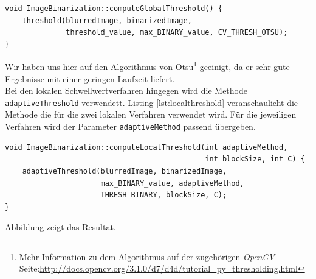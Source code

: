 \begin{lstlisting}[label=lst:globalthreshold, caption=Binarisierung des Eingabebilds mithilfe des globalen Schwellwertverfahrens.]
void ImageBinarization::computeGlobalThreshold() {
	threshold(blurredImage, binarizedImage,
			  threshold_value, max_BINARY_value, CV_THRESH_OTSU);
}
\end{lstlisting}

Wir haben uns hier auf den Algorithmus von Otsu\footnote{Mehr Information zu dem Algorithmus auf der zugehörigen \emph{OpenCV} Seite:\url{http://docs.opencv.org/3.1.0/d7/d4d/tutorial_py_thresholding.html}} geeinigt, da er sehr gute Ergebnisse mit einer geringen Laufzeit liefert.\\

Bei den lokalen Schwellwertverfahren hingegen wird die Methode \texttt{adaptiveThreshold} verwendett. Listing \ref{lst:localthreshold} veranschaulicht die Methode die für die zwei lokalen Verfahren verwendet wird. Für die jeweiligen Verfahren wird der Parameter \texttt{adaptiveMethod} passend übergeben.

\begin{lstlisting}[label=lst:localthreshold, caption=Binarisierung des Eingabebilds mithilfe eines lokalen Schwellwertverfahrens.]
void ImageBinarization::computeLocalThreshold(int adaptiveMethod,
											  int blockSize, int C) {
	adaptiveThreshold(blurredImage, binarizedImage,
					  max_BINARY_value, adaptiveMethod,
					  THRESH_BINARY, blockSize, C);
}
\end{lstlisting}

Abbildung  zeigt das Resultat.


